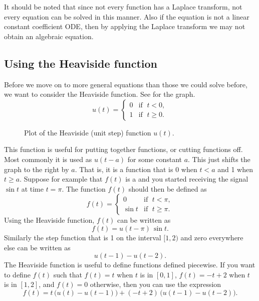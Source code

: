It should be noted that since not every function has a Laplace transform,
not every equation can be solved in this manner.  Also if the equation
is not a linear constant coefficient ODE,
then by applying the Laplace transform we may not
obtain an algebraic equation.

\subsection{Using the Heaviside function}

Before we move on to more general equations
than those we could solve before,
we want to consider the Heaviside function.  See 
for the graph.
\begin{equation*}
u(t) =
\begin{cases}
0 & \text{if } \; t < 0 , \\ 
1 & \text{if } \; t \geq 0 .
\end{cases}
\end{equation*}

\begin{figure}[h!t]
\capstart
\begin{center}
\caption{Plot of the Heaviside (unit step) function
$u(t)$.\label{lt:heavisidefig}}
\end{center}
\end{figure}

This function is useful for
putting together functions, or cutting functions off.  Most commonly it is
used as $u(t-a)$ for some constant $a$.  This just shifts the graph to the
right by $a$.  That is, it is a function that is 0 when $t < a$ and 1
when $t \geq a$.  Suppose for example that $f(t)$ is a  and
you started receiving the signal
$\sin t$ at time $t=\pi$.  The function $f(t)$ should then be defined as
\begin{equation*}
f(t) =
\begin{cases}
0 & \text{if } \; t < \pi , \\ 
\sin t & \text{if } \; t \geq \pi .
\end{cases}
\end{equation*}
Using the Heaviside function, $f(t)$ can
be written as
\begin{equation*}
f(t) = u(t - \pi) \, \sin t .
\end{equation*}
Similarly the step function that is 1 on the interval $[1,2)$ and zero
everywhere else can be written as
\begin{equation*}
u(t - 1) - u(t-2) .
\end{equation*}
The Heaviside function is useful to define functions defined piecewise.  If
you want to define $f(t)$ such that $f(t) = t$ when $t$ is in $[0,1]$,
$f(t) = -t+2$
when $t$ is in $[1,2]$, and $f(t) = 0$ otherwise, then you can use the expression
\begin{equation*}
f(t) = t \, \bigl( u(t) - u(t-1) \bigr) + 
(-t+2) \, \bigl( u(t - 1) - u(t-2) \bigr) .
\end{equation*}

